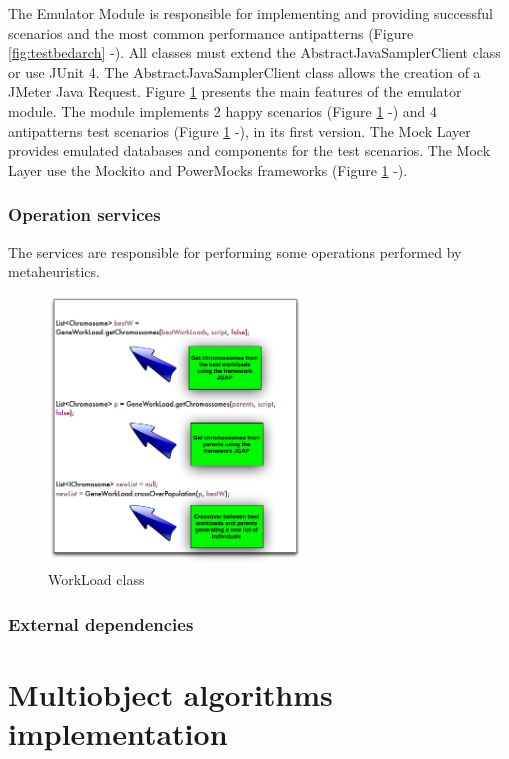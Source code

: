 \documentclass{report}
\begin{document}
The Emulator Module is responsible for implementing and providing successful scenarios and the most common performance antipatterns (Figure \ref{fig:testbedarch}  -). All classes must extend the AbstractJavaSamplerClient class or use JUnit 4. The AbstractJavaSamplerClient class allows the creation of a JMeter Java Request. Figure \ref{fig:emulator} presents the main features of the emulator module. The module implements 2 happy scenarios (Figure \ref{fig:emulator}  -) and  4 antipatterns test scenarios (Figure \ref{fig:emulator}  -), in its first version. The Mock Layer provides emulated databases and components for the test scenarios. The Mock Layer use the Mockito and PowerMocks frameworks (Figure \ref{fig:emulator}  -). 

\subsection{Operation services}

The services are responsible for performing some operations performed by metaheuristics.

\begin{figure}[!h]
\centering
\includegraphics[width=0.6\textwidth]{./images/operationservice.png}
\caption{WorkLoad class}
\label{fig:emulator}
\end{figure} 

\subsection{External dependencies}


\chapter{Multiobject algorithms implementation}
\end{document}
